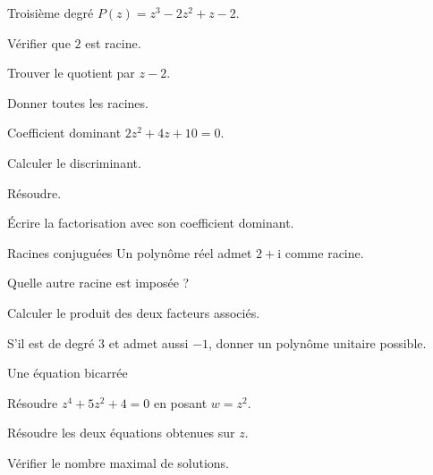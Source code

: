 \begingroup\renewcommand{\otBesoinPlace}[1]{}\begin{minipage}{\linewidth}
\begin{exercice}[2]{Troisième degré}
$P(z)=z^3-2z^2+z-2$.
\begin{questions}
\item Vérifier que $2$ est racine.
\item Trouver le quotient par $z-2$.
\item Donner toutes les racines.
\end{questions}
\end{exercice}
\begin{exercice}[2]{Coefficient dominant}
$2z^2+4z+10=0$.
\begin{questions}
\item Calculer le discriminant.
\item Résoudre.
\item Écrire la factorisation avec son coefficient dominant.
\end{questions}
\end{exercice}
\begin{exercice}[2]{Racines conjuguées}
Un polynôme réel admet $2+\mathrm i$ comme racine.
\begin{questions}
\item Quelle autre racine est imposée ?
\item Calculer le produit des deux facteurs associés.
\item S’il est de degré $3$ et admet aussi $-1$, donner un polynôme unitaire possible.
\end{questions}
\end{exercice}
\begin{exercice}[2]{Une équation bicarrée}

\begin{questions}
\item Résoudre $z^4+5z^2+4=0$ en posant $w=z^2$.
\item Résoudre les deux équations obtenues sur $z$.
\item Vérifier le nombre maximal de solutions.
\end{questions}
\end{exercice}
\end{minipage}\endgroup
\clearpage
{}
